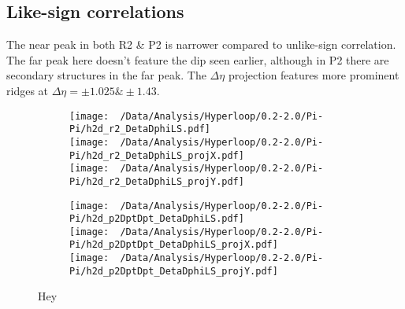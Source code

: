 \documentclass[12pt,a4paper,twoside]{report}
\begin{document}
\subsection{Like-sign correlations}
The near peak in both R2 \& P2 is narrower compared to unlike-sign correlation. The far peak here doesn't feature the dip seen earlier, although in P2 there are secondary structures in the far peak. The $\Delta\eta$ projection features more prominent ridges at $\Delta\eta=\pm1.025\&\pm1.43$.
\begin{figure}[H]
	\begin{subfigure}{0.49\linewidth}
		\texttt{[image: ~/Data/Analysis/Hyperloop/0.2-2.0/Pi-Pi/h2d\_r2\_DetaDphiLS.pdf]}\\
		\texttt{[image: ~/Data/Analysis/Hyperloop/0.2-2.0/Pi-Pi/h2d\_r2\_DetaDphiLS\_projX.pdf]}\\
		\texttt{[image: ~/Data/Analysis/Hyperloop/0.2-2.0/Pi-Pi/h2d\_r2\_DetaDphiLS\_projY.pdf]}\\
	\end{subfigure}
	\begin{subfigure}{0.49\linewidth}
		\texttt{[image: ~/Data/Analysis/Hyperloop/0.2-2.0/Pi-Pi/h2d\_p2DptDpt\_DetaDphiLS.pdf]}\\
		\texttt{[image: ~/Data/Analysis/Hyperloop/0.2-2.0/Pi-Pi/h2d\_p2DptDpt\_DetaDphiLS\_projX.pdf]}\\
		\texttt{[image: ~/Data/Analysis/Hyperloop/0.2-2.0/Pi-Pi/h2d\_p2DptDpt\_DetaDphiLS\_projY.pdf]}\\
	\end{subfigure}
	\caption{Hey}
\end{figure}
\end{document}
